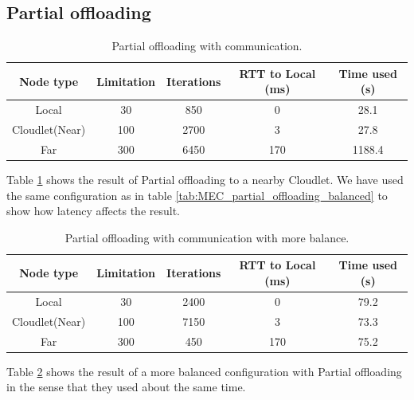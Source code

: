 \subsection{Partial offloading}
\begin{table}[h!]
    \centering
    \begin{tabular}[c]{|c|c|c|c|c|}
        \hline
        Node type & Limitation & Iterations & RTT to Local (ms)& Time used (s)\\
        \hline
        \hline
        Local           & 30 & 850 & 0 & 28.1  \\
        \hline
        Cloudlet(Near)  & 100 & 2700 & 3 & 27.8 \\
        \hline
        Far             & 300 & 6450 & 170 & 1188.4 \\
        \hline
    \end{tabular}
    \caption{Partial offloading with communication.}
    \label{tab:Cloudlet_partial_offloading_latency}
\end{table}
Table \ref{tab:Cloudlet_partial_offloading_latency} shows the result of Partial offloading to a nearby Cloudlet. We have used the same configuration as in table \ref{tab:MEC_partial_offloading_balanced} to show how latency affects the result. 





\begin{table}[h!]
    \centering
    \begin{tabular}[c]{|c|c|c|c|c|}
        \hline
        Node type & Limitation & Iterations & RTT to Local (ms)& Time used (s)\\
        \hline
        \hline
        Local           & 30 & 2400 & 0 & 79.2  \\
        \hline
        Cloudlet(Near)  & 100 & 7150 & 3 & 73.3 \\
        \hline
        Far             & 300 & 450 & 170 & 75.2 \\
        \hline
    \end{tabular}
    \caption{Partial offloading with communication with more balance.}
    \label{tab:Cloudlet_partial_offloading_latency_balanced}
\end{table}
Table \ref{tab:Cloudlet_partial_offloading_latency_balanced} shows the result of a more balanced configuration with Partial offloading in the sense that they used about the same time.







